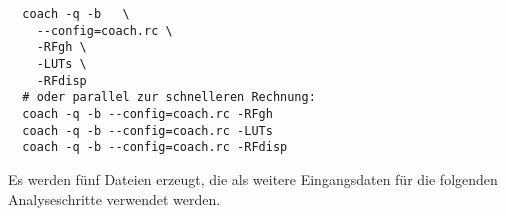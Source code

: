 \begin{lstlisting}
  coach -q -b	\
    --config=coach.rc \
    -RFgh \
    -LUTs \
    -RFdisp
  # oder parallel zur schnelleren Rechnung:
  coach -q -b --config=coach.rc -RFgh
  coach -q -b --config=coach.rc -LUTs
  coach -q -b --config=coach.rc -RFdisp
\end{lstlisting}

Es werden fünf Dateien erzeugt,
die als weitere Eingangsdaten für die folgenden Analyseschritte verwendet
werden.
